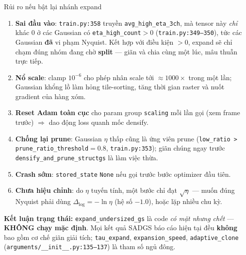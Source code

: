 \begin{frame}{Rủi ro nếu bật lại nhánh expand}
\footnotesize
\begin{enumerate}\itemsep2pt
    \item \textbf{Sai đầu vào}: \texttt{train.py:358} truyền \texttt{avg\_high\_eta\_3ch}, mà tensor này \emph{chỉ} khác $0$ ở các Gaussian có \texttt{eta\_high\_count}$>0$ (\texttt{train.py:349--350}), tức các Gaussian \textbf{đã} vi phạm Nyquist. Kết hợp với điều kiện $>0$, expand sẽ chỉ chạm đúng nhóm đang chờ \textbf{split} --- giãn và chia cùng một lúc, mâu thuẫn trực tiếp.
    \item \textbf{Nổ scale}: clamp $10^{-6}$ cho phép nhân scale tới $\approx\!1000\times$ trong một lần; Gaussian khổng lồ làm hỏng tile-sorting, tăng thời gian raster và nuốt gradient của hàng xóm.
    \item \textbf{Reset Adam toàn cục} cho param group \texttt{scaling} mỗi lần gọi (xem frame trước) $\Rightarrow$ dao động loss quanh mốc densify.
    \item \textbf{Chống lại prune}: Gaussian $\eta$ thấp cũng là ứng viên prune (\texttt{low\_ratio > prune\_ratio\_threshold}$=0.8$, \texttt{train.py:353}); giãn chúng ngay trước \texttt{densify\_and\_prune\_structgs} là làm việc thừa.
    \item \textbf{Crash sớm}: \texttt{stored\_state} \texttt{None} nếu gọi trước bước optimizer đầu tiên.
    \item \textbf{Chưa hiệu chỉnh}: do $\eta$ tuyến tính, một bước chỉ đạt $\sqrt{\eta}$ --- muốn đúng Nyquist phải dùng $\Delta_{\log}=-\ln\eta$ (hệ số $-1.0$), hoặc lặp nhiều chu kỳ.
\end{enumerate}
\vspace{0.1cm}
\textbf{Kết luận trạng thái:} \texttt{expand\_undersized\_gs} là code \emph{có mặt nhưng chết} --- \textbf{KHÔNG chạy mặc định}. Mọi kết quả SADGS báo cáo hiện tại đều \textbf{không} bao gồm cơ chế giãn giải tích; \texttt{tau\_expand}, \texttt{expansion\_speed}, \texttt{adaptive\_clone} (\texttt{arguments/\_\_init\_\_.py:135--137}) là tham số ngủ đông.
\end{frame}

